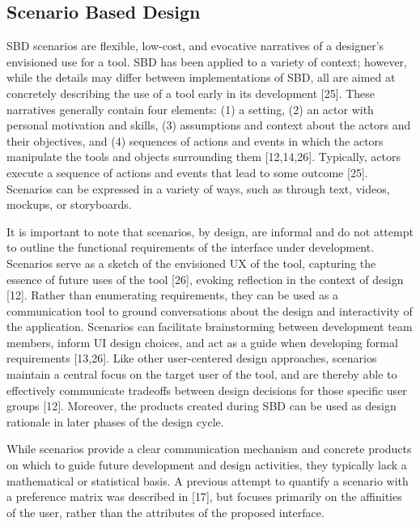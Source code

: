 \documentclass[]{article}
\begin{document}
\subsection{Scenario Based Design}\label{scenario-based-design}

SBD scenarios are flexible, low-cost, and evocative narratives of a
designer's envisioned use for a tool. SBD has been applied to a variety
of context; however, while the details may differ between
implementations of SBD, all are aimed at concretely describing the use
of a tool early in its development {[}25{]}. These narratives generally
contain four elements: (1) a setting, (2) an actor with personal
motivation and skills, (3) assumptions and context about the actors and
their objectives, and (4) sequences of actions and events in which the
actors manipulate the tools and objects surrounding them {[}12,14,26{]}.
Typically, actors execute a sequence of actions and events that lead to
some outcome {[}25{]}. Scenarios can be expressed in a variety of ways,
such as through text, videos, mockups, or storyboards.

It is important to note that scenarios, by design, are informal and do
not attempt to outline the functional requirements of the interface
under development. Scenarios serve as a sketch of the envisioned UX of
the tool, capturing the essence of future uses of the tool {[}26{]},
evoking reflection in the context of design {[}12{]}. Rather than
enumerating requirements, they can be used as a communication tool to
ground conversations about the design and interactivity of the
application. Scenarios can facilitate brainstorming between development
team members, inform UI design choices, and act as a guide when
developing formal requirements {[}13,26{]}. Like other user-centered
design approaches, scenarios maintain a central focus on the target user
of the tool, and are thereby able to effectively communicate tradeoffs
between design decisions for those specific user groups {[}12{]}.
Moreover, the products created during SBD can be used as design
rationale in later phases of the design cycle.

While scenarios provide a clear communication mechanism and concrete
products on which to guide future development and design activities,
they typically lack a mathematical or statistical basis. A previous
attempt to quantify a scenario with a preference matrix was described in
{[}17{]}, but focuses primarily on the affinities of the user, rather
than the attributes of the proposed interface.
\end{document}
